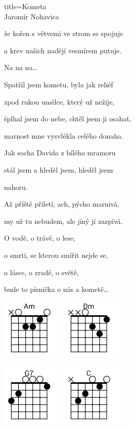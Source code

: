 \begin{song}{title=\predtitle\centering Kometa \\\large Jaromír Nohavica \vspace*{-0.3cm}}
{\begin{centerjustified}
\begin{varwidth}[t]{0.5\textwidth}
	že kořen s větvemi ve strom se spojuje
	
	a krev našich nadějí vesmírem putuje.

Na na na\elipsa\dots

\sloka
	Spatřil jsem kometu, byla jak reliéf
	
	zpod rukou umělce, který už nežije,
	
	šplhal jsem do nebe, chtěl jsem ji osahat,
	
	marnost mne vysvlékla celého donaha.
	
\sloka
	Jak socha Davida z bílého mramoru

	stál jsem a hleděl jsem, hleděl jsem

	nahoru.

	Až příště přiletí, ach, pýcho marnivá,

	my už tu nebudem, ale jiný jí zazpívá.


	O vodě, o trávě, o lese,

	o smrti, se kterou smířit nejde se,

	o lásce, o zradě, o světě,

	bude to písnička o nás a kometě\elipsa\dots



\phantom{.}

\phantom{.}

\includegraphics[width = 3cm]{../Akordy/am.png}
\includegraphics[width = 3cm]{../Akordy/dm.png}

\includegraphics[width = 3cm]{../Akordy/g7.png}
\includegraphics[width = 3cm]{../Akordy/c.png}


\end{varwidth}
\end{centerjustified}}
\end{song}
